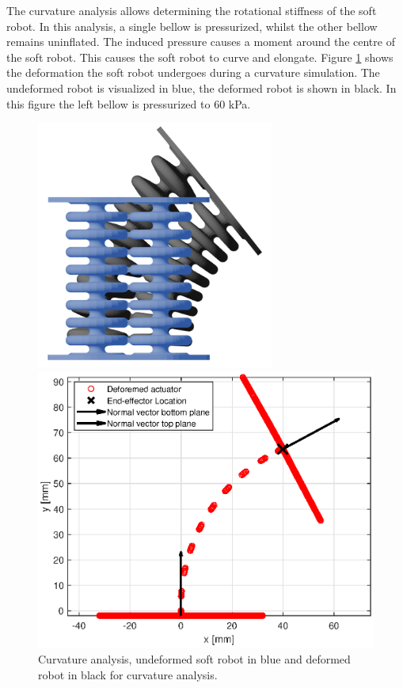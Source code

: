 The curvature analysis allows determining the rotational stiffness of the soft robot. In this analysis, a single bellow is pressurized, whilst the other bellow remains uninflated. The induced pressure causes a moment around the centre of the soft robot. This causes the soft robot to curve and elongate. Figure \ref{fig3:schematiccurvature} shows the deformation the soft robot undergoes during a curvature simulation. The undeformed robot is visualized in blue, the deformed robot is shown in black. In this figure the left bellow is pressurized to 60 kPa.



\begin{figure}[H]
    \centering
\begin{minipage}{0.5\textwidth}
        \centering
        \includegraphics[width=0.695\textwidth]{Figures/Chapter3/curvature.png} 
        \caption{Curvature analysis, undeformed soft robot in blue and deformed robot in black for curvature analysis. }
        \label{fig3:schematiccurvature}
    \end{minipage}\hfill
    \begin{minipage}{0.5\textwidth}
        \centering
        \includegraphics[width=\textwidth]{Figures/Chapter3/rotation60kpa.eps} 

\end{minipage}
\end{figure}
